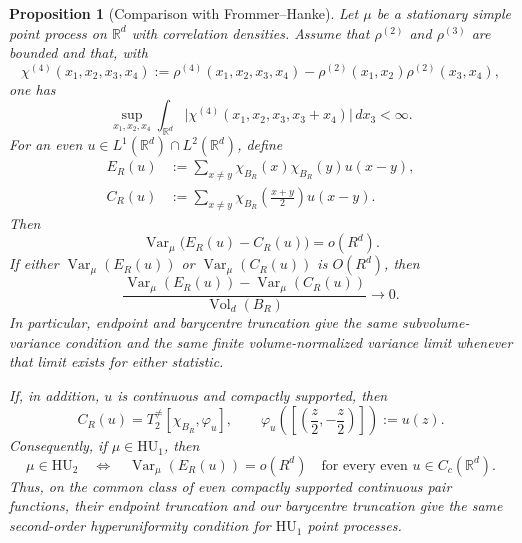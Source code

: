 \documentclass[11pt,reqno,a4paper]{amsart}
\numberwithin{equation}{section}
\theoremstyle{compact}
\newtheorem{proposition}[proposition]{Proposition}
\theoremstyle{definition}
\theoremstyle{definition}
\newcommand{\HU}{\mathrm{HU}}
\newcommand{\Var}{\operatorname{Var}}
\newcommand{\Vol}{\operatorname{Vol}}
\begin{document}
\begin{proposition}[Comparison with Frommer--Hanke]\label{prop:FH-comparison}
Let $\mu$ be a stationary simple point process on $\mathbb R^d$ with
correlation densities.  Assume that $\rho^{(2)}$ and $\rho^{(3)}$ are bounded
and that, with
\[
  \chi^{(4)}(x_1,x_2,x_3,x_4)
  :=\rho^{(4)}(x_1,x_2,x_3,x_4)
    -\rho^{(2)}(x_1,x_2)\rho^{(2)}(x_3,x_4),
\]
one has
\begin{equation}\label{eq:FH-four-point-integrability}
  \sup_{x_1,x_2,x_4}
  \int_{\mathbb R^d}
  \big|\chi^{(4)}(x_1,x_2,x_3,x_3+x_4)\big|\,dx_3<\infty.
\end{equation}
For an even $u\in L^1(\mathbb R^d)\cap L^2(\mathbb R^d)$, define
\begin{align*}
  E_R(u)
  &:=\sum_{x\neq y}\chi_{B_R}(x)\chi_{B_R}(y)u(x-y),\\
  C_R(u)
  &:=\sum_{x\neq y}\chi_{B_R}\!\left(\frac{x+y}{2}\right)u(x-y).
\end{align*}
Then
\begin{equation}\label{eq:endpoint-barycentre-difference}
  \Var_\mu\big(E_R(u)-C_R(u)\big)=o(R^d).
\end{equation}
If either $\Var_\mu(E_R(u))$ or $\Var_\mu(C_R(u))$ is $O(R^d)$, then
\begin{equation}\label{eq:endpoint-barycentre-normalized-difference}
  \frac{\Var_\mu(E_R(u))-\Var_\mu(C_R(u))}{\Vol_d(B_R)}\longrightarrow0.
\end{equation}
In particular, endpoint and barycentre truncation give the same
subvolume-variance condition and the same finite volume-normalized variance
limit whenever that limit exists for either statistic.

If, in addition, $u$ is continuous and compactly supported, then
\begin{equation}\label{eq:FH-barycentre-is-T2neq}
  C_R(u)=T_2^{\neq}[\chi_{B_R},\varphi_u],
  \qquad
  \varphi_u\!\left(\left[\left(\frac z2,-\frac z2\right)\right]\right):=u(z).
\end{equation}
Consequently, if $\mu\in\HU_1$, then
\begin{equation}\label{eq:FH-HU2-equivalence}
  \mu\in\HU_2
  \quad\Longleftrightarrow\quad
  \Var_\mu(E_R(u))=o(R^d)
  \quad\text{for every even }u\in C_c(\mathbb R^d).
\end{equation}
Thus, on the common class of even compactly supported continuous pair
functions, their endpoint truncation and our barycentre truncation give the
same second-order hyperuniformity condition for $\HU_1$ point processes.
\end{proposition}
\end{document}
